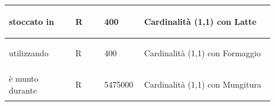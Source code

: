 \documentclass[12pt,a4paper]{article}
\begin{document}
\begin{center}
\begin{longtable}{|p{0.23\linewidth}|p{0.1\linewidth}|p{0.11\linewidth}|p{0.45\linewidth}|}
\hline
stoccato in 				& \begin{center}
\vspace{-25pt}R
\end{center}
					& \begin{center}
					\vspace{-25pt}400\end{center}
					&  Cardinalità (1,1) con Latte \\ 

\hline
utilizzando 				& \begin{center}
\vspace{-25pt}R
\end{center}
					& \begin{center}
					\vspace{-25pt}400\end{center}
					&  Cardinalità (1,1) con Formaggio \\ 

\hline
è munto durante 				& \begin{center}
\vspace{-25pt}R
\end{center}
					& \begin{center}
					\vspace{-25pt}5475000\end{center}
					&   Cardinalità (1,1) con Mungitura \\

\hline

\end{longtable}\end{center}
\end{document}
